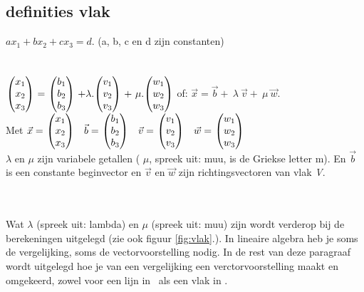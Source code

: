 \documentclass[hidelinks, a4wide, 12pt,  twoside]{book}
\begin{document}

\subsection{definities vlak}
{$ ax_1 + bx_2 + cx_3 = d $. \quad  \quad (a, b, c en d zijn constanten) } \\

\\  \\

{  $ \vecdriesnel{x} \ =\ \vecdriesnel{b}  \ +  \lambda. \vecdriesnel{v} \   + \  \mu. \vecdriesnel{w} $ \qquad \qquad  of:  $ \vec{x}  =   \vec{b}  + \  \lambda \ \vec{v} + \  \mu \ \vec{w}  $. }\\ 
Met $ \vec{x}  = \   \vecdriesnel{x}  \quad    \vec{b} = \  \vecdriesnel{b} \quad    \vec{v} =  \  \vecdriesnel{v} \quad   \vec{w} =  \ \vecdriesnel{w} $  \\   $ \lambda $ en  $ \mu $ zijn variabele getallen ( $ \mu $, spreek uit: muu, is de Griekse letter m). En  $ \vec{b} $ is een constante beginvector en $ \vec{v}  $  en $ \vec{w}  $ zijn richtingsvectoren van vlak \textit{V}.\\ \\ \\ 


Wat  $ \lambda $ (spreek uit: lambda) en  $ \mu $ (spreek uit: muu) zijn wordt verderop bij de berekeningen uitgelegd (zie ook figuur  \ref{fig:vlak}.).  In lineaire algebra heb je soms de vergelijking, soms de vectorvoorstelling nodig. In de rest van deze paragraaf wordt uitgelegd hoe je van een vergelijking een verctorvoorstelling maakt en omgekeerd, zowel voor een lijn in \RT \ als een vlak in \RD. 
\end{document}
